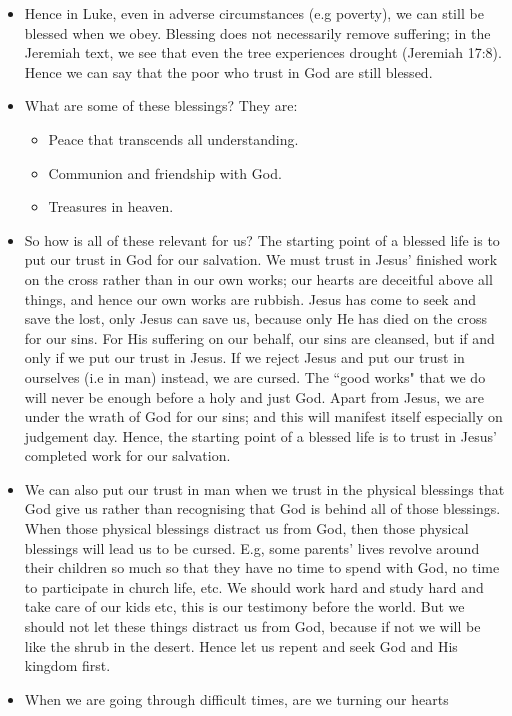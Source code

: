\begin{itemize}
{  their trust is in the LORD.}
  \item{Hence in Luke, even in adverse circumstances (e.g poverty), we can
  still be blessed when we obey.  Blessing does not necessarily remove
  suffering; in the Jeremiah text, we see that even the tree experiences
  drought (Jeremiah 17:8).  Hence we can say that the poor who trust in God
  are still blessed.}
  \item{What are some of these blessings? They are:
  \begin{itemize}
    \item{Peace that transcends all understanding.}
    \item{Communion and friendship with God.}
    \item{Treasures in heaven.}
  \end{itemize}}
  \item{So how is all of these relevant for us?  The starting point of a
  blessed life is to put our trust in God for our salvation.  We must trust
  in Jesus' finished work on the cross rather than in our own works; our
  hearts are deceitful above all things, and hence our own works are rubbish.
  Jesus has come to seek and save the lost, only Jesus can save us, because
  only He has died on the cross for our sins.  For His suffering on our
  behalf, our sins are cleansed, but if and only if we put our trust in
  Jesus.  If we reject Jesus and put our trust in ourselves (i.e in man)
  instead, we are cursed.  The ``good works" that we do will never be enough
  before a holy and just God.  Apart from Jesus, we are under the wrath of
  God for our sins; and this will manifest itself especially on judgement
  day.  Hence, the starting point of a blessed life is to trust in Jesus'
  completed work for our salvation.}
  \item{We can also put our trust in man when we trust in the physical
  blessings that God give us rather than recognising that God is behind all
  of those blessings.  When those physical blessings distract us from God,
  then those physical blessings will lead us to be cursed.  E.g, some
  parents' lives revolve around their children so much so that they have no
  time to spend with God, no time to participate in church life, etc.  We
  should work hard and study hard and take care of our kids etc, this is our
  testimony before the world.  But we should not let these things distract us
  from God, because if not we will be like the shrub in the desert.  Hence
  let us repent and seek God and His kingdom first.}
  \item{When we are going through difficult times, are we turning our hearts
}
\end{itemize}
